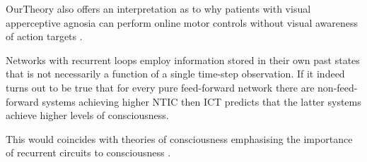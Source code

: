 \documentclass[utf8]{article}
\begin{document}
        		\ac{OurTheory} also offers an interpretation as to why patients with visual apperceptive agnosia \citep{james2003ventral} can perform online motor controls without visual awareness of action targets \citep{10.3389/fneur.2014.00255}. 
                
                
               
                
                Networks with recurrent loops employ information stored in their own past states that is not necessarily a function of a single time-step observation. 
        		If it indeed turns out to be true that for every pure feed-forward network there are non-feed-forward systems achieving higher NTIC then ICT predicts that the latter  systems achieve higher levels of consciousness. 
        		
        		
        		This would coincides with theories of consciousness emphasising the importance of recurrent circuits to consciousness \citep{lamme2006towards, edelman1992bright, tononi2008neural}.
\end{document}
